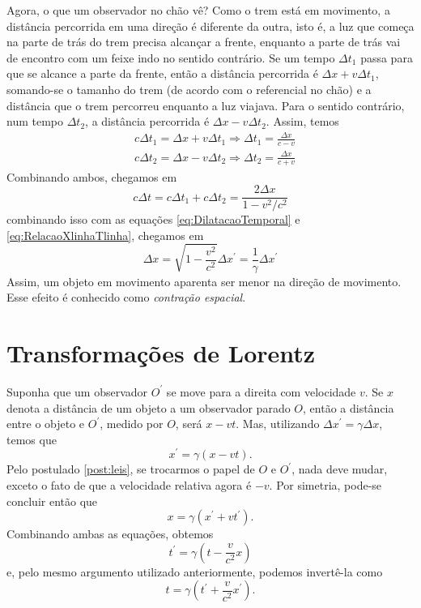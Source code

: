 Agora, o que um observador no chão vê? Como o trem está em movimento, a distância percorrida em uma direção é diferente da outra, isto é, a luz que começa na parte de trás do trem precisa alcançar a frente, enquanto a parte de trás vai de encontro com um feixe indo no sentido contrário. Se um tempo $\Delta t_1$ passa para que se alcance a parte da frente, então a distância percorrida é $\Delta x + v\Delta t_1$, somando-se o tamanho do trem (de acordo com o referencial no chão) e a distância que o trem percorreu enquanto a luz viajava. Para o sentido contrário, num tempo $\Delta t_2$, a distância percorrida é $\Delta x-v\Delta t_2$. Assim, temos 
\begin{align*}
    &c\Delta t_1 = \Delta x + v\Delta t_1 \Rightarrow \Delta t_1 = \frac{\Delta x}{c-v}\\
    &c\Delta t_2 = \Delta x - v\Delta t_2 \Rightarrow \Delta t_2 = \frac{\Delta x}{c+v}
\end{align*}
Combinando ambos, chegamos em
\[
    c\Delta t = c\Delta t_1 + c\Delta t_2 = \frac{2\Delta x}{1-v^2/c^2}
\]
combinando isso com as equações \eqref{eq:DilatacaoTemporal} e \eqref{eq:RelacaoXlinhaTlinha}, chegamos em
\begin{equation}\label{eq:ContracaoEspacial}
    \Delta x = \sqrt{1-\frac{v^2}{c^2}}\Delta x^\prime = \frac{1}{\gamma}\Delta x^\prime
\end{equation}
Assim, um objeto em movimento aparenta ser menor na direção de movimento. Esse efeito é conhecido como \textit{contração espacial}.

\section{Transformações de Lorentz}

Suponha que um observador $O^\prime$ se move para a direita com velocidade $v$. Se $x$ denota a distância de um objeto a um observador parado $O$, então a distância entre o objeto e $O^\prime$, medido por $O$, será $x-vt$. Mas, utilizando $\Delta x^\prime = \gamma \Delta x$, temos que
\begin{equation}\label{eq:LorentzX}
    x^\prime = \gamma (x-vt).
\end{equation}
Pelo postulado \ref{post:leis}, se trocarmos o papel de $O$ e $O^\prime$, nada deve mudar, exceto o fato de que a velocidade relativa agora é $-v$. Por simetria, pode-se concluir então que
\begin{equation}\label{eq:LorentzXInversa}
    x = \gamma (x^\prime + vt^\prime) .
\end{equation}
Combinando ambas as equações, obtemos
\begin{equation}\label{eq:LorentzT}
    t^\prime = \gamma \left(t - \frac{v}{c^2}x\right)
\end{equation}
e, pelo mesmo argumento utilizado anteriormente, podemos invertê-la como
\begin{equation}\label{eq:LorentzTInversa}
    t = \gamma \left(t^\prime + \frac{v}{c^2}x^\prime\right) .
\end{equation}

